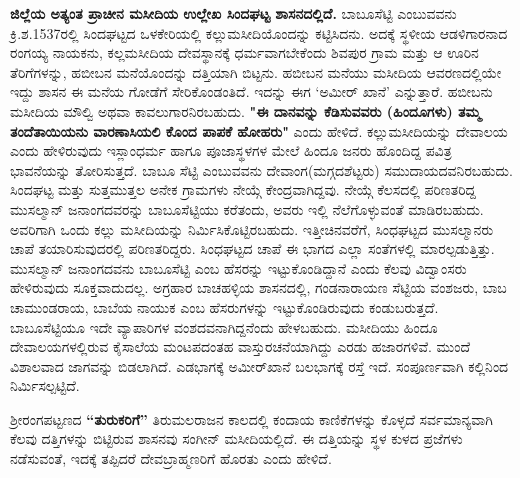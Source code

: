 \textbf{ಜಿಲ್ಲೆಯ ಅತ್ಯಂತ ಪ್ರಾಚೀನ ಮಸೀದಿಯ ಉಲ್ಲೇಖ ಸಿಂದಘಟ್ಟ ಶಾಸನದಲ್ಲಿದೆ.} ಬಾಬೂಸೆಟ್ಟಿ ಎಂಬುವವನು ಕ್ರಿ.ಶ.1537ರಲ್ಲಿ ಸಿಂದಘಟ್ಟದ ಒಳಕೇರಿಯಲ್ಲಿ ಕಲ್ಲುಮಸೀದಿಯೊಂದನ್ನು ಕಟ್ಟಿಸಿದನು. ಅದಕ್ಕೆ ಸ್ಥಳೀಯ ಆಡಳಿಗಾರನಾದ ರಂಗಯ್ಯ ನಾಯಕನು, ಕಲ್ಲಮಸೀದಿಯ ದೇವಸ್ಥಾನಕ್ಕೆ ಧರ್ಮವಾಗಬೇಕೆಂದು ಶಿವಪುರ ಗ್ರಾಮ ಮತ್ತು ಆ ಊರಿನ ತೆರಿಗೆಗಳನ್ನು, ಹಬೀಬನ ಮನೆಯೊಂದನ್ನು ದತ್ತಿಯಾಗಿ ಬಿಟ್ಟನು. ಹಬೀಬನ ಮನೆಯು ಮಸೀದಿಯ ಆವರಣದಲ್ಲಿಯೇ ಇದ್ದು ಶಾಸನ ಈ ಮನೆಯ ಗೋಡೆಗೆ ಸೇರಿಕೊಂಡಂತಿದೆ. ಇದನ್ನು ಈಗ ‘ಅಮೀರ್​ ಖಾನೆ’ ಎನ್ನುತ್ತಾರೆ. ಹಬೀಬನು ಮಸೀದಿಯ ಮೌಲ್ವಿ ಅಥವಾ ಕಾವಲುಗಾರನಿರಬಹುದು. \textbf{"ಈ ದಾನವನ್ನು ಕೆಡಿಸುವವರು (ಹಿಂದೂಗಳು) ತಮ್ಮ ತಂದೆತಾಯಿಯನು ವಾರಣಾಸಿಯಲಿ ಕೊಂದ ಪಾಪಕೆ ಹೋಹರು"} ಎಂದು ಹೇಳಿದೆ. ಕಲ್ಲುಮಸೀದಿಯನ್ನು ದೇವಾಲಯ ಎಂದು ಹೇಳಿರುವುದು ಇಸ್ಲಾಂಧರ್ಮ ಹಾಗೂ ಪೂಜಾಸ್ಥಳಗಳ ಮೇಲೆ ಹಿಂದೂ ಜನರು ಹೊಂದಿದ್ದ ಪವಿತ್ರ ಭಾವನೆಯನ್ನು ತೋರಿಸುತ್ತದೆ. ಬಾಬೂ ಸೆಟ್ಟಿ ಎಂಬುವವನು ದೇವಾಂಗ(ಮಗ್ಗದಶೆಟ್ಟರು) ಸಮುದಾಯದವನಿರಬಹುದು. ಸಿಂದಘಟ್ಟ ಮತ್ತು ಸುತ್ತಮುತ್ತಲ ಅನೇಕ ಗ್ರಾಮಗಳು ನೇಯ್ಗೆ ಕೇಂದ್ರವಾಗಿದ್ದವು. ನೇಯ್ಗೆ ಕೆಲಸದಲ್ಲಿ ಪರಿಣತರಿದ್ದ ಮುಸಲ್ಮಾನ್​ ಜನಾಂಗದವರನ್ನು ಬಾಬೂಸೆಟ್ಟಿಯು ಕರೆತಂದು, ಅವರು ಇಲ್ಲಿ ನೆಲೆಗೊಳ್ಳುವಂತೆ ಮಾಡಿರಬಹುದು. ಅವರಿಗಾಗಿ ಒಂದು ಕಲ್ಲು ಮಸೀದಿಯನ್ನು ನಿರ್ಮಿಸಿಕೊಟ್ಟಿರಬಹುದು. ಇತ್ತೀಚಿನವರೆಗೆ, ಸಿಂಧಘಟ್ಟದ ಮುಸಲ್ಮಾನರು ಚಾಪೆ ತಯಾರಿಸುವುದರಲ್ಲಿ ಪರಿಣತರಿದ್ದರು. ಸಿಂಧಘಟ್ಟದ ಚಾಪೆ ಈ ಭಾಗದ ಎಲ್ಲಾ ಸಂತೆಗಳಲ್ಲಿ ಮಾರಲ್ಪಡುತ್ತಿತ್ತು. ಮುಸಲ್ಮಾನ್​ ಜನಾಂಗದವನು ಬಾಬೂಸೆಟ್ಟಿ ಎಂಬ ಹೆಸರನ್ನು ಇಟ್ಟುಕೊಂಡಿದ್ದಾನೆ ಎಂದು ಕೆಲವು ವಿದ್ವಾಂಸರು ಹೇಳಿರುವುದು ಸೂಕ್ತವಾದುದಲ್ಲ. ಅಗ್ರಹಾರ ಬಾಚಹಳ್ಳಿಯ ಶಾಸನದಲ್ಲಿ, ಗಂಡನಾರಾಯಣ ಸೆಟ್ಟಿಯ ವಂಶಜರು, ಬಾಬ ಚಾಮುಂಡರಾಯ, ಬಾಬೆಯ ನಾಯುಕ ಎಂಬ ಹೆಸರುಗಳನ್ನು ಇಟ್ಟುಕೊಂಡಿರುವುದು ಕಂಡುಬರುತ್ತದೆ. ಬಾಬೂಸೆಟ್ಟಿಯೂ ಇದೇ ವ್ಯಾಪಾರಿಗಳ ವಂಶದವನಾಗಿದ್ದನೆಂದು ಹೇಳಬಹುದು. ಮಸೀದಿಯು ಹಿಂದೂ ದೇವಾಲಯಗಳಲ್ಲಿರುವ ಕೈಸಾಲೆಯ ಮಂಟಪದಂತಹ ವಾಸ್ತುರಚನೆಯಾಗಿದ್ದು ಎರಡು ಹಜಾರಗಳಿವೆ. ಮುಂದೆ ವಿಶಾಲವಾದ ಜಾಗವನ್ನು ಬಿಡಲಾಗಿದೆ. ಎಡಭಾಗಕ್ಕೆ ಅಮೀರ್​ಖಾನೆ ಬಲಭಾಗಕ್ಕೆ ರಸ್ತೆ ಇದೆ. ಸಂಪೂರ್ಣವಾಗಿ ಕಲ್ಲಿನಿಂದ ನಿರ್ಮಿಸಲ್ಪಟ್ಟಿದೆ.

ಶ‍್ರೀರಂಗಪಟ್ಟಣದ \textbf{“ತುರುಕರಿಗೆ”} ತಿರುಮಲರಾಜನ ಕಾಲದಲ್ಲಿ ಕಂದಾಯ ಕಾಣಿಕೆಗಳನ್ನು ಕೊಳ್ಳದೆ ಸರ್ವಮಾನ್ಯ\-ವಾಗಿ ಕೆಲವು ದತ್ತಿಗಳನ್ನು ಬಿಟ್ಟಿರುವ ಶಾಸನವು ಸಂಗೀನ್​ ಮಸೀದಿಯಲ್ಲಿದೆ. ಈ ದತ್ತಿಯನ್ನು ಸ್ಥಳ ಕುಳದ ಪ್ರಜೆಗಳು ನಡೆಸುವಂತೆ, ಇದಕ್ಕೆ ತಪ್ಪಿದರೆ ದೇವಬ್ರಾಹ್ಮಣರಿಗೆ ಹೊರತು ಎಂದು ಹೇಳಿದೆ.

